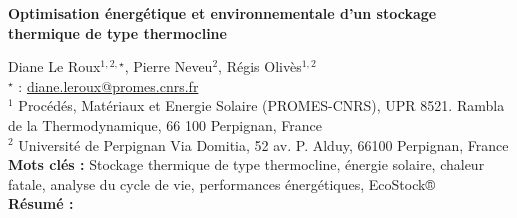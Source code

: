 


    \newpage

\BgThispage

%
\begin{flushleft}
\addtocounter{section}{1}
{\Large \textbf{Optimisation énergétique et environnementale d'un stockage thermique de type thermocline}}\label{ref:32}
\end{flushleft}
%
Diane Le Roux$^{1,2,\star}$, Pierre Neveu$^{2}$, Régis Olivès$^{1,2}$\\[2mm]
$^{\star}$ \Letter : \url{diane.leroux@promes.cnrs.fr}\\[2mm]
{\footnotesize $^{1}$ Procédés, Matériaux et Energie Solaire (PROMES-CNRS), UPR 8521. Rambla de la Thermodynamique, 66 100 Perpignan, France}\\
{\footnotesize $^{2}$ Université de Perpignan Via Domitia, 52 av. P. Alduy, 66100 Perpignan, France}\\
[4mm]
%
\noindent \textbf{Mots clés : } Stockage thermique de type thermocline, énergie solaire, chaleur fatale, analyse du cycle de vie, performances énergétiques, EcoStock®\\[4mm]
%
\noindent \textbf{Résumé : } 

